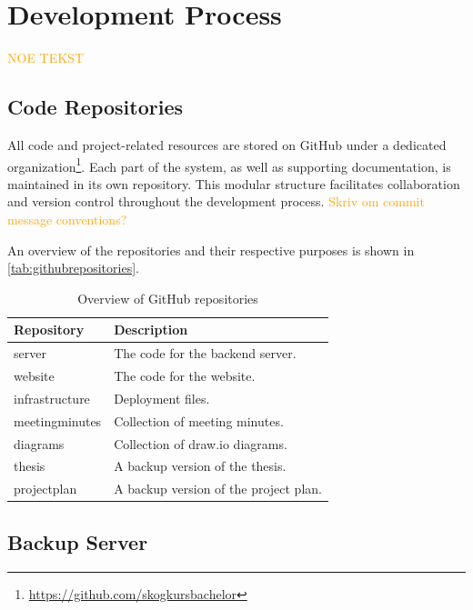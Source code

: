 \chapter{Development Process}\label{chap:developmentprocess}

\textcolor{orange}{NOE TEKST}

\section{Code Repositories}

All code and project-related resources are stored on GitHub under a dedicated organization\footnote{\url{https://github.com/skogkursbachelor}}. Each part of the system, as well as supporting documentation, is maintained in its own repository. This modular structure facilitates collaboration and version control throughout the development process. \textcolor{orange}{Skriv om commit message conventions?}

An overview of the repositories and their respective purposes is shown in \autoref{tab:githubrepositories}.

\begin{table}[h]
    \centering
    \begin{tabular}{l|l}
        \hline
        \textbf{Repository} & \textbf{Description} \\
        \hline
        server & The code for the backend server. \\
        website & The code for the website. \\
        \hline
        infrastructure & Deployment files. \\ 
        meetingminutes & Collection of meeting minutes. \\
        diagrams & Collection of draw.io\tablefootnote{\url{https://www.drawio.com/}} diagrams. \\
        \hline
        thesis & A backup version of the thesis. \\
        projectplan & A backup version of the project plan. \\
        \hline
    \end{tabular}
    \caption[Overview of GitHub repositories]{Overview of GitHub repositories}
    \label{tab:githubrepositories}
\end{table}

\section{Backup Server}

